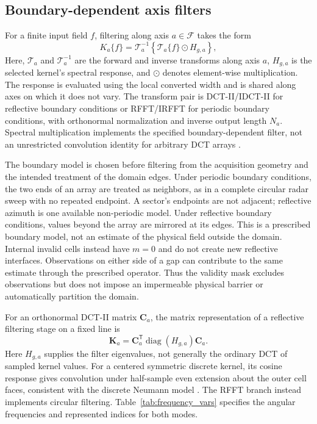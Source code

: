 \documentclass[a4paper,fleqn]{cas-sc}
\newcommand{\vect}[1]{\boldsymbol{#1}}  %
\newcommand{\mat}[1]{\mathbf{#1}}       %
\begin{document}

\subsection{Boundary-dependent axis filters}

For a finite input field $f$, filtering along axis $a\in\mathcal{F}$ takes the form
\begin{equation}
	K_a\{f\} = \mathcal{T}_a^{-1}\!\left\{\mathcal{T}_a\{f\} \odot H_{g,a}\right\},
	\label{eq:smooth_operator}
\end{equation}
Here, \(\mathcal T_a\) and \(\mathcal T_a^{-1}\) are the forward and inverse transforms along axis \(a\), \(H_{g,a}\) is the selected kernel's spectral response, and \(\odot\) denotes element-wise multiplication. The response is evaluated using the local converted width and is shared along axes on which it does not vary. The transform pair is DCT-II/IDCT-II for reflective boundary conditions or RFFT/IRFFT for periodic boundary conditions, with orthonormal normalization and inverse output length \(N_a\). Spectral multiplication implements the specified boundary-dependent filter, not an unrestricted convolution identity for arbitrary DCT arrays \citep{Oppenheim1999,Strang1999,Martucci1994}.

The boundary model is chosen before filtering from the acquisition geometry and the intended treatment of the domain edges. Under periodic boundary conditions, the two ends of an array are treated as neighbors, as in a complete circular radar sweep with no repeated endpoint. A sector's endpoints are not adjacent; reflective azimuth is one available non-periodic model. Under reflective boundary conditions, values beyond the array are mirrored at its edges. This is a prescribed boundary model, not an estimate of the physical field outside the domain. Internal invalid cells instead have $m=0$ and do not create new reflective interfaces. Observations on either side of a gap can contribute to the same estimate through the prescribed operator. Thus the validity mask excludes observations but does not impose an impermeable physical barrier or automatically partition the domain.

For an orthonormal DCT-II matrix $\mat{C}_a$, the matrix representation of a reflective filtering stage on a fixed line is
\begin{equation}
	\mat{K}_a=\mat{C}_a^{\mathsf{T}}\operatorname{diag}(H_{g,a})\mat{C}_a.
	\label{eq:boundary_operator}
\end{equation}
Here $H_{g,a}$ supplies the filter eigenvalues, not generally the ordinary DCT of sampled kernel values. For a centered symmetric discrete kernel, its cosine response gives convolution under half-sample even extension about the outer cell faces, consistent with the discrete Neumann model \citep{Strang1999,Ng1999,Martucci1994}. The RFFT branch instead implements circular filtering. Table~\ref{tab:frequency_vars} specifies the angular frequencies and represented indices for both modes.
\end{document}
